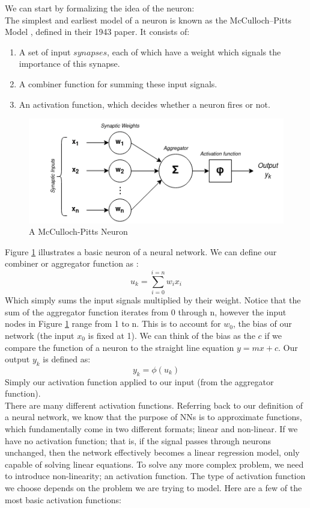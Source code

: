 \documentclass[12pt]{article}
\begin{document}
 We can start by formalizing the idea of the neuron: \\\newline
The simplest and earliest model of a neuron is known as the McCulloch–Pitts Model \autocite{mcculloch1943logical}, defined in their 1943 paper. It consists of:
\begin{enumerate}
    \item A set of input $synapses$, each of which have a weight which signals the importance of this synapse.
    \item A combiner function for summing these input signals.
    \item An activation function, which decides whether a neuron fires or not.
\end{enumerate} 
\begin{figure}[H]
    \centering
    \includegraphics[scale=0.8]{2.png}
    \caption{A McCulloch-Pitts Neuron }
    \label{neuron}
\end{figure}
Figure \ref{neuron} illustrates a basic neuron of a neural network. We can define our combiner or aggregator function as : 
\begin{equation}
    u_k = \sum\limits_{i=0}^{i=n}w_ix_i
\end{equation}
Which simply sums the input signals multiplied by their weight. Notice that the sum of the aggregator function iterates from 0 through n, however the input nodes in Figure \ref{neuron} range from 1 to n. This is to account for $w_0$, the bias of our network (the input $x_0$ is fixed at 1). We can think of the bias as the $c$ if we compare the function of a neuron to the straight line equation $y = mx+c$. Our output $y_k$ is defined as:
\begin{equation}
    y_k = \phi(u_k)
\end{equation} 
Simply our activation function applied to our input (from the aggregator function). \\\newline
There are many different activation functions. Referring back to our definition of a neural network, we know that the purpose of NNs is to approximate functions, which fundamentally come in two different formats; linear and non-linear. If we have no activation function; that is, if the signal passes through neurons unchanged, then the network effectively becomes a linear regression model, only capable of solving linear equations. To solve any more complex problem, we need to introduce non-linearity; an activation function. The type of activation function we choose depends on the problem we are trying to model. Here are a few of the most basic activation functions:
\end{document}
